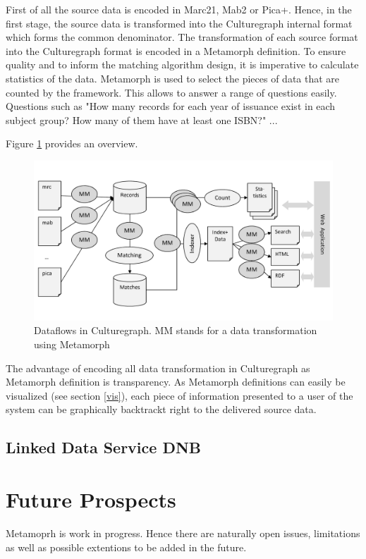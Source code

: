 \documentclass[12pt,a4paper]{article}
\begin{document}
First of all the source data is encoded in Marc21, Mab2 or Pica+. Hence, in the first stage, the source data is transformed into the Culturegraph internal format which forms the common denominator. The transformation of each source format into the Culturegraph format is encoded in a Metamorph definition. 
To ensure quality and to inform the matching algorithm design, it is imperative to calculate statistics of the data. Metamorph is used to select the pieces of data that are counted by the framework. This allows to answer a range of questions easily. Questions such as "How many records for each year of issuance exist in each subject group? How many of them have at least one ISBN?"
...

 Figure \ref{fig:flow} provides an overview.

\begin{figure}[htp]
\centering
\includegraphics[width=.96\textwidth]{figures/flow}
\caption{Dataflows in Culturegraph. MM stands for a data transformation using Metamorph}\label{fig:flow}
\end{figure}

The advantage of encoding all data transformation in Culturegraph as Metamorph definition is transparency. As Metamorph definitions can easily be visualized (see section \ref{vis}), each piece of information presented to a user of the system can be graphically backtrackt right to the delivered source data.


\subsection{Linked Data Service DNB}


\section{Future Prospects}
Metamoprh is work in progress. Hence there are naturally open issues, limitations as well as possible extentions to be added in the future. 
\end{document}
